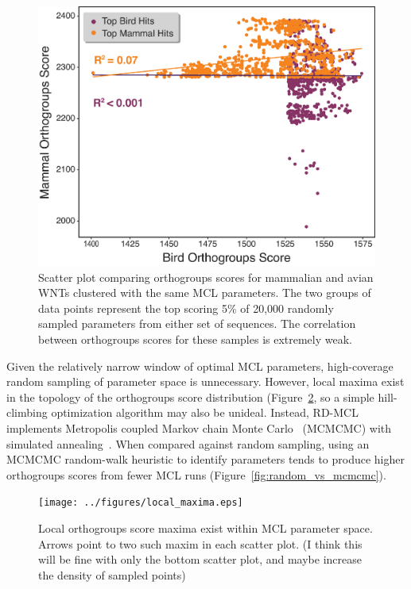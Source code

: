 \documentclass[twocolumn]{bmcart}  %
\begin{document}
\begin{figure}[t]
  \begin{center}
  \includegraphics[height=0.25\textheight]{../figures/mamm_bird_max_scores.eps}
\end{center}
\caption{Scatter plot comparing orthogroups scores for mammalian and avian WNTs clustered with the same MCL parameters. The two groups of data points represent the top scoring 5\% of 20,000 randomly sampled parameters from either set of sequences. The correlation between orthogroups scores for these samples is extremely weak.}
\label{fig:mamm_bird_max_scores}
\end{figure}

Given the relatively narrow window of optimal MCL parameters, high-coverage random sampling of parameter space is unnecessary.
However, local maxima exist in the topology of the orthogroups score distribution (Figure~\ref{fig:local_maxima}, so a simple hill-climbing optimization algorithm may also be unideal.
Instead, RD-MCL implements Metropolis coupled Markov chain Monte Carlo~\cite{Hastings:1970iw} (MCMCMC) with simulated annealing~\cite{Kirkpatrick:1983kv}.
When compared against random sampling, using an MCMCMC random-walk heuristic to identify parameters tends to produce higher orthogroups scores from fewer MCL runs (Figure~\ref{fig:random_vs_mcmcmc}).


\begin{figure}[t]
  \begin{center}
  \texttt{[image: ../figures/local\_maxima.eps]}
\end{center}
\caption{Local orthogroups score maxima exist within MCL parameter space. Arrows point to two such maxim in each scatter plot. (I think this will be fine with only the bottom scatter plot, and maybe increase the density of sampled points)}
\label{fig:local_maxima}
\end{figure}
\end{document}
